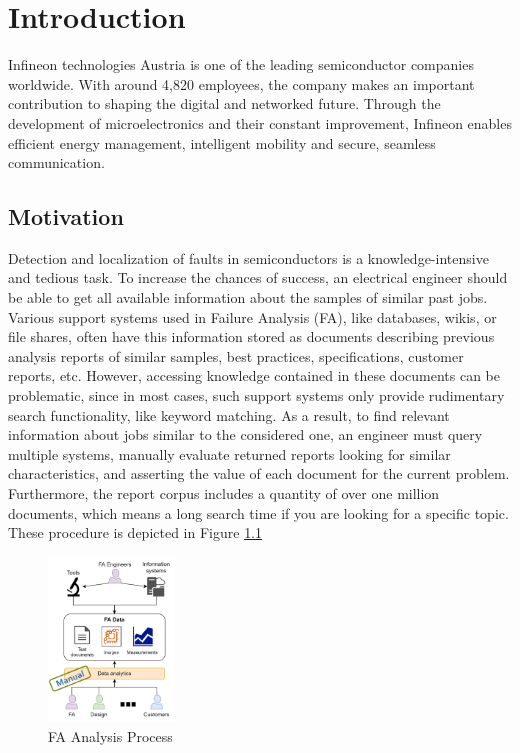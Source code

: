 \chapter{Introduction} \label{chapter:introduction}

Infineon technologies Austria is one of the leading semiconductor companies worldwide. With around 4,820 employees, the company makes an important contribution to shaping the digital and networked future. Through the development of microelectronics and their constant improvement, Infineon enables efficient energy management, intelligent mobility and secure, seamless communication. \newline

\section{Motivation}
Detection and localization of faults in semiconductors is a knowledge-intensive and tedious task. To increase the chances of success, an electrical engineer should be able to get all available information about the samples of similar past jobs. Various support systems used in Failure Analysis (FA), like databases, wikis, or file shares, often have this information stored as documents describing previous analysis reports of similar samples, best practices, specifications, customer reports, etc. However, accessing knowledge contained in these documents can be problematic, since in most cases, such support systems only provide rudimentary search functionality, like keyword matching. As a result, to find relevant information about jobs similar to the considered one, an engineer must query multiple systems, manually evaluate returned reports looking for similar characteristics, and asserting the value of each document for the current problem. Furthermore, the report corpus includes a quantity of over one million documents, which means a long search time if you are looking for a specific topic. These procedure is depicted in Figure \ref{fig:fa_process}

\begin{figure}[H]
	\centering
	\includegraphics[width=0.3\textwidth]{figures/fa_process.png}
	\caption{FA Analysis Process}
	\label{fig:fa_process}
\end{figure}

